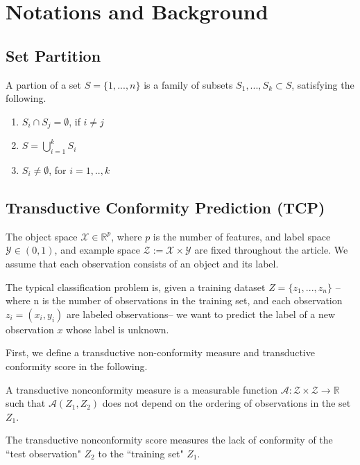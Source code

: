 \documentclass[main]{subfiles}
\begin{document}
\section{Notations and Background}
\subsection{Set Partition}
A partion of a set $S = \{ 1,...,n\}$ is a family of subsets $S_1, ..., S_k \subset S$, satisfying the following.
\begin{enumerate}
\item $S_i \cap S_j = \emptyset$, if $i \neq j$
\item $S = \bigcup_{i=1}^k S_i$
\item $ S_i \neq \emptyset$, for $i={1,..,k}$
\end{enumerate}
\subsection{Transductive Conformity Prediction (TCP)}
The object space $\mathcal{X} \in \mathbb{R}^p$, where $p$ is the number of features, and  label space $\mathcal{Y} \in (0,1)$, and example space $\mathcal{Z} := \mathcal{X} \times \mathcal{Y}$ are fixed throughout the article. We assume that each observation consists of an object
and its label.

The typical classification problem is, given a training dataset $Z = \{ z_1 , ..., z_n \} $ -- where n is the number of observations in the training set, and each observation $z_i = (x_i, y_i)$ are labeled observations-- we want to predict the label of a new observation $x$ whose label is unknown. 

First, we define a transductive non-conformity measure and transductive conformity score in the following.

\begin{definition} 
A transductive nonconformity measure is a measurable function $\mathcal{A} : \mathcal{Z} \times \mathcal{Z}  \rightarrow \mathbb{R}$ such that $\mathcal{A}(Z_1 , Z_2 )$ does not depend on the ordering of observations in the set $Z_1$.
\end{definition}

\begin{definition}
The transductive nonconformity score measures the lack of conformity of the ``test observation" $Z_2$ to the ``training set" $Z_1$.
\end{definition}
\end{document}
